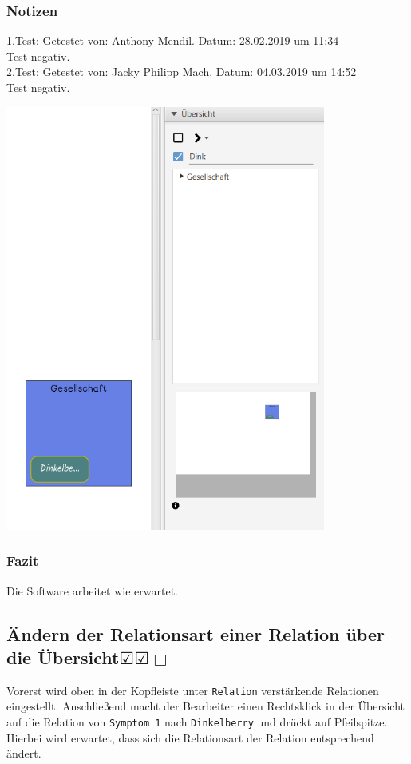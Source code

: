 \documentclass[enabledeprecatedfontcommands]{scrartcl}
\newcommand{\subsectiont}[2]{\subsection[#1]{#1{\normalsize\normalfont #2}}}
\newcommand{\leer}{$\Box$}
\newcommand{\ok}{$\CheckedBox$}
\begin{document}
\subsubsection{Notizen}
1.Test: Getestet von: Anthony Mendil. Datum: 28.02.2019 um 11:34 \\
Test negativ. \\
2.Test: Getestet von: Jacky Philipp Mach. Datum: 04.03.2019 um 14:52 \\
Test negativ.
\begin{center}
\includegraphics[height=14cm]{zoomKontext.PNG}
\end{center}
\subsubsection{Fazit}
Die Software arbeitet wie erwartet.

\subsectiont{Ändern der Relationsart einer Relation über die Übersicht}{\dotfill\ok\ok\leer}
Vorerst wird oben in der Kopfleiste unter \texttt{Relation} verstärkende Relationen eingestellt. Anschließend macht der Bearbeiter einen Rechtsklick in der Übersicht auf die Relation von \texttt{Symptom 1} nach \texttt{Dinkelberry} und drückt auf Pfeilspitze. Hierbei wird erwartet, dass sich die Relationsart der Relation entsprechend ändert.
\end{document}
